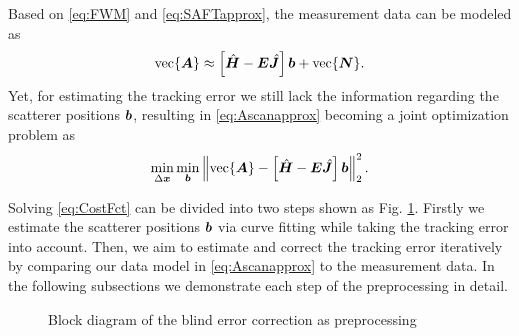 Based on \eqref{eq:FWM} and \eqref{eq:SAFTapprox}, the measurement data can be modeled as 
\begin{equation} \label{eq:Ascanapprox}
	\vectorize{\Ascan} \approx \left[ \SAFThat - \Error \SAFTdothat \right] \defect + \vectorize{\bm{N}}.
\end{equation}
Yet, for estimating the tracking error we still lack the information regarding the scatterer positions $\bm{b}$, resulting in \eqref{eq:Ascanapprox} becoming a joint optimization problem as
\begin{equation} \label{eq:CostFct}
	\min_{\xxdelta} \min_{\defect} 
	\norm{ 
		\vectorize{\Ascan} - \left[ \SAFThat - \Error \SAFTdothat \right] \defect	 
	}_2^{2}.
\end{equation} \par

Solving \eqref{eq:CostFct} can be divided into two steps shown as Fig. \ref{fig:blockdiagram}. Firstly we estimate the scatterer positions $\bm{b}$ via curve fitting while taking the tracking error into account. Then, we aim to estimate and correct the tracking error iteratively by comparing our data model in \eqref{eq:Ascanapprox} to the measurement data. In the following subsections we demonstrate each step of the preprocessing in detail.
%
\begin{figure} 
	\caption{Block diagram of the blind error correction as preprocessing}
	\label{fig:blockdiagram}
\end{figure}

